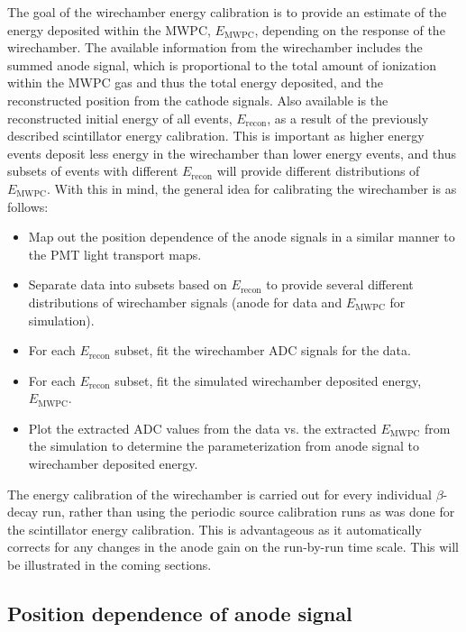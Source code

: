 The goal of the wirechamber energy calibration is to provide an estimate of
the energy deposited within the MWPC, $E_{\mathrm{MWPC}}$, depending on the
response of the wirechamber. The available information from the wirechamber includes the
summed anode signal, which is proportional to the total amount of ionization
within the MWPC gas and thus the total energy deposited, and the reconstructed position from the cathode signals.
Also available is the reconstructed initial energy of all events, $E_{\mathrm{recon}}$, as a result of the
previously described scintillator energy calibration. This is important as higher energy events deposit
less energy in the wirechamber than lower energy events, and thus subsets of events with
different $E_{\mathrm{recon}}$ will provide different distributions of $E_{\mathrm{MWPC}}$.
With this in mind, the general idea for calibrating the wirechamber is as follows:

\begin{itemize}
\item Map out the position dependence of the anode signals in a similar manner to the
  PMT light transport maps.
\item Separate data into subsets based on $E_{\mathrm{recon}}$
  to provide several different distributions of wirechamber signals (anode for data and $E_{\mathrm{MWPC}}$
  for simulation).
\item For each $E_{\mathrm{recon}}$ subset, fit the wirechamber ADC signals for the data.
\item For each $E_{\mathrm{recon}}$ subset, fit the simulated wirechamber deposited energy, $E_{\mathrm{MWPC}}$.
\item Plot the extracted ADC values from the data vs. the extracted $E_{\mathrm{MWPC}}$ from the simulation to
  determine the parameterization from anode signal to wirechamber deposited energy.
\end{itemize}

The energy calibration of the wirechamber is carried out for every individual $\beta$-decay run,
rather than using the periodic
source calibration runs as was done for the scintillator energy calibration. This is advantageous as
it automatically corrects for any changes in the anode gain on the run-by-run time scale. This will
be illustrated in the coming sections.


\subsection{Position dependence of anode signal}

